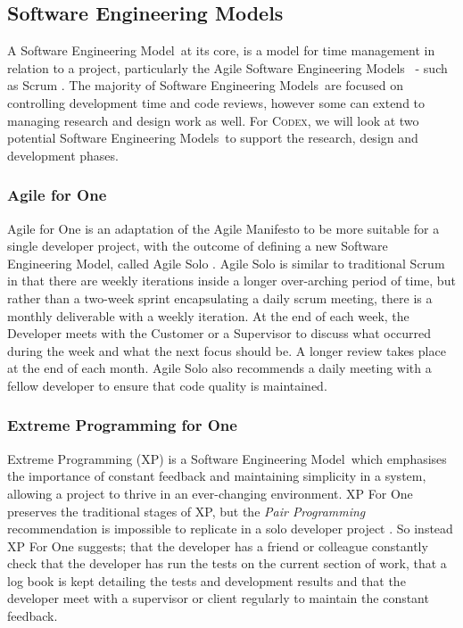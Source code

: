 \documentclass[review]{cmpreport}
\newcommand{\sem}{Software Engineering Model}
\newcommand{\sems}{Software Engineering Models}
\newcommand{\Codex}{\textsc{Codex}}
\begin{document}
	\subsection{Software Engineering Models} \label{SEMLit}
	A \sem \ at its core, is a model for time management in relation to a project, particularly the Agile \sems \ \citep{AgileManifesto} - such as Scrum  \citep{Scrum} . The majority of \sems \ are focused on controlling development time and code reviews, however some can extend to managing research and design work as well. For \Codex, we will look at two potential \sems \ to support the research, design and development phases. 
	 
	\subsubsection{Agile for One}
	Agile for One is an adaptation of the Agile Manifesto to be more suitable for a single developer project, with the outcome of defining a new \sem , called Agile Solo \citep{AgileSolo}. Agile Solo is similar to traditional Scrum in that there are weekly iterations inside a longer over-arching period of time, but rather than a two-week sprint encapsulating a daily scrum meeting, there is a monthly deliverable with a weekly iteration. At the end of each week, the Developer meets with the Customer or a Supervisor to discuss what occurred during the week and what the next focus should be. A longer review takes place at the end of each month. Agile Solo also recommends a daily meeting with a fellow developer to ensure that code quality is maintained. 
	
	\subsubsection{Extreme Programming for One}
	Extreme Programming (XP) is a \sem \ which emphasises the importance of constant feedback and maintaining simplicity in a system, allowing a project to thrive in an ever-changing environment. XP For One preserves the traditional stages of XP, but the \emph{Pair Programming} recommendation is impossible to replicate in a solo developer project \citep{SoloXP}. So instead XP For One suggests; that the developer has a friend or colleague constantly check that the developer has run the tests on the current section of work, that a log book is kept detailing the tests and development results and that the developer meet with a supervisor or client regularly to maintain the constant feedback. 
	
\end{document}
